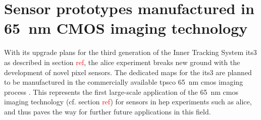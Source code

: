 %
\chapter{Sensor prototypes manufactured in 65~nm CMOS imaging technology}
\label{chap:sensor-prototypes}
%
With its upgrade plans for the third generation of the Inner Tracking System \gls{its3} as described in section \textcolor{red}{ref}, the \gls{alice} experiment breaks new ground with the development of novel pixel sensors. 
The dedicated \gls{maps} for the \gls{its3} are planned to be manufactured in the commercially available \gls{tpsco} \qty{65}{\nm} \gls{cmos} imaging process \cite{TowerSemiWebsite}.
This represents the first large-scale application of the \qty{65}{\nm} \gls{cmos} imaging technology (cf. section \textcolor{red}{ref}) for sensors in \gls{hep} experiments such as \gls{alice}, and thus paves the way for further future applications in this field. 

